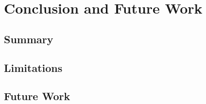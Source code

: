 \chapter{Conclusion and Future Work}
\label{ch:Conclusion}


\section{Summary}


\section{Limitations}


\section{Future Work}



